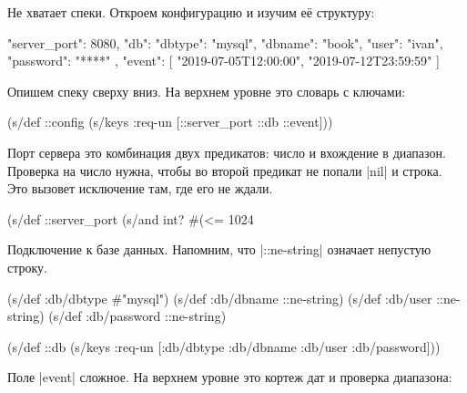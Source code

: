 Не хватает спеки. Откроем конфигурацию и изучим е\"{е} структуру:


\begin{english}
  \begin{json}
{
    "server_port": 8080,
    "db": {
        "dbtype":   "mysql",
        "dbname":   "book",
        "user":     "ivan",
        "password": "****"
    },
    "event": [
        "2019-07-05T12:00:00",
        "2019-07-12T23:59:59"
    ]
}
  \end{json}
\end{english}

\noindent
Опишем спеку сверху вниз. На верхнем уровне это словарь с ключами:

\begin{english}
  \begin{clojure}
(s/def ::config
  (s/keys :req-un [::server_port ::db ::event]))
  \end{clojure}
\end{english}


Порт сервера это комбинация двух предикатов: число и вхождение в диапазон.
Проверка на число нужна, чтобы во второй предикат не попали \spverb|nil| и
строка. Это вызовет исключение там, где его не ждали.

\begin{english}
  \begin{clojure}
(s/def ::server_port
  (s/and int? #(<= 1024 %
  \end{clojure}
\end{english}


\noindent
Подключение к базе данных. Напомним, что \spverb|::ne-string| означает
непустую строку.

\begin{english}
  \begin{clojure}
(s/def :db/dbtype   #{"mysql"})
(s/def :db/dbname   ::ne-string)
(s/def :db/user     ::ne-string)
(s/def :db/password ::ne-string)

(s/def ::db
  (s/keys :req-un [:db/dbtype
                   :db/dbname
                   :db/user
                   :db/password]))
  \end{clojure}
\end{english}

Поле \spverb|event| сложное. На верхнем уровне это кортеж дат и проверка
диапазона:

